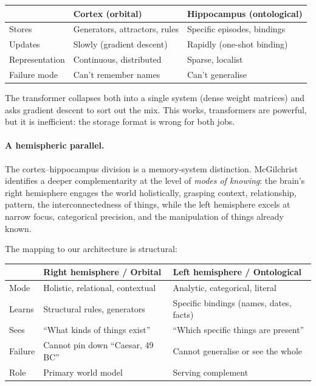 \documentclass[11pt, a4paper]{article}
\theoremstyle{remark}
\begin{document}
\begin{center}\small
\begin{tabular}{@{}lll@{}}
\toprule
& \textbf{Cortex (orbital)} & \textbf{Hippocampus (ontological)} \\
\midrule
Stores & Generators, attractors, rules & Specific episodes, bindings \\
Updates & Slowly (gradient descent) & Rapidly (one-shot binding) \\
Representation & Continuous, distributed & Sparse, localist \\
Failure mode & Can't remember names & Can't generalise \\
\bottomrule
\end{tabular}
\end{center}

The transformer collapses both into a single system (dense weight matrices) and asks gradient descent to sort out the mix.
This works, transformers are powerful, but it is inefficient: the storage format is wrong for both jobs.

\paragraph{A hemispheric parallel.}
The cortex--hippocampus division is a memory-system distinction.
McGilchrist~\cite{mcgilchrist2009master, mcgilchrist2021matter} identifies a deeper complementarity at the level of \emph{modes of knowing}: the brain's right hemisphere engages the world holistically, grasping context, relationship, pattern, the interconnectedness of things, while the left hemisphere excels at narrow focus, categorical precision, and the manipulation of things already known.

The mapping to our architecture is structural:

\begin{center}\small
\begin{tabular}{@{}lll@{}}
\toprule
& \textbf{Right hemisphere / Orbital} & \textbf{Left hemisphere / Ontological} \\
\midrule
Mode & Holistic, relational, contextual & Analytic, categorical, literal \\
Learns & Structural rules, generators & Specific bindings (names, dates, facts) \\
Sees & ``What kinds of things exist'' & ``Which specific things are present'' \\
Failure & Cannot pin down ``Caesar, 49\,BC'' & Cannot generalise or see the whole \\
Role & Primary world model & Serving complement \\
\bottomrule
\end{tabular}
\end{center}
\end{document}
